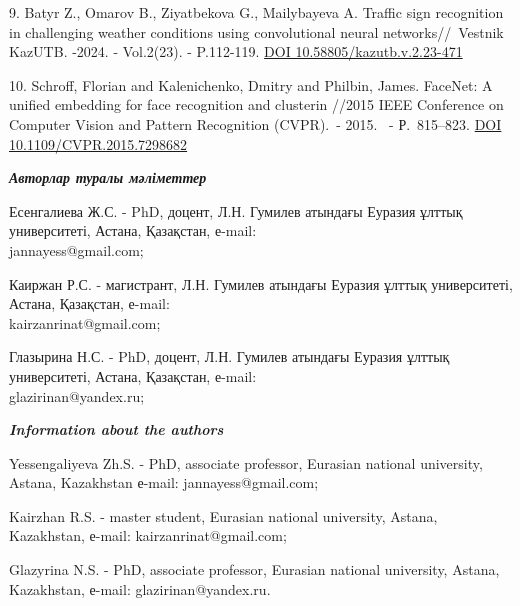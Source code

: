 \begin{references}
9. Batyr Z., Omarov B., Ziyatbekova G., Mailybayeva A. Traffic sign
recognition in challenging weather conditions using convolutional neural
networks//~Vestnik KazUTB. -2024. - Vol.2(23). - P.112-119.
\href{https://doi.org/10.58805/kazutb.v.2.23-471}{DOI
10.58805/kazutb.v.2.23-471}

10. Schroff, Florian and Kalenichenko, Dmitry and Philbin, James.
FaceNet: A unified embedding for face recognition and clusterin //2015
IEEE Conference on Computer Vision and Pattern Recognition (CVPR).~-
2015. ~- Р.~815--823.
\href{https://doi.org/10.1109/CVPR.2015.7298682}{DOI
10.1109/CVPR.2015.7298682}
\end{references}

\begin{authorinfo}
\emph{{\bfseries Авторлар туралы мәліметтер}}

Есенгалиева Ж.С. - PhD, доцент, Л.Н. Гумилев атындағы Еуразия ұлттық
университеті, Астана, Қазақстан, е-mail: \\jannayess@gmail.com;

Каиржан Р.С. - магистрант, Л.Н. Гумилев атындағы Еуразия ұлттық
университеті, Астана, Қазақстан, е-mail: \\kairzanrinat@gmail.com;

Глазырина Н.С. - PhD, доцент, Л.Н. Гумилев атындағы Еуразия ұлттық
университеті, Астана, Қазақстан, е-mail: \\glazirinan@yandex.ru;

\emph{{\bfseries Information about the authors}}

Yessengaliyeva Zh.S. - PhD, associate professor, Eurasian national
university, Astana, Kazakhstan е-mail: jannayess@gmail.com;

Kairzhan R.S. - master student, Eurasian national university, Astana,
Kazakhstan, е-mail: kairzanrinat@gmail.com;

Glazyrina N.S. - PhD, associate professor, Eurasian national university,
Astana, Kazakhstan, е-mail: glazirinan@yandex.ru.
\end{authorinfo}
